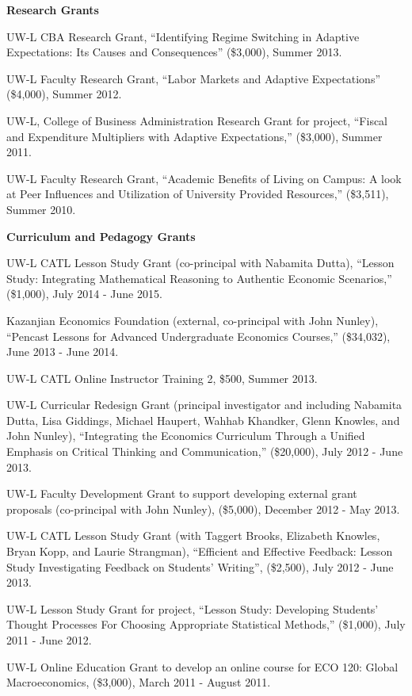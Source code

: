 \documentclass[11pt]{article}
\newcommand{\bd}{\begin{description}}
\newcommand{\ed}{\end{description}}
\newcommand{\toprule}{\par\vspace*{2pt}\noindent{\hrule\hfill}\par\vspace*{1pt}}
\begin{document}
\textbf{Research Grants} \toprule
\bd
\item UW-L CBA Research Grant, ``Identifying Regime Switching in Adaptive Expectations: Its Causes and Consequences'' (\$3,000), Summer 2013.
\item UW-L Faculty Research Grant, ``Labor Markets and Adaptive Expectations'' (\$4,000), Summer 2012.
\item UW-L, College of Business Administration Research Grant for project, ``Fiscal and Expenditure Multipliers with Adaptive Expectations,'' (\$3,000), Summer 2011.
\item UW-L Faculty Research Grant, ``Academic Benefits of Living on Campus: A look at Peer Influences and Utilization of University Provided Resources,'' (\$3,511), Summer 2010. 
\ed

\textbf{Curriculum and Pedagogy Grants} \toprule
\bd
\item UW-L CATL Lesson Study Grant (co-principal with Nabamita Dutta), ``Lesson Study: Integrating Mathematical Reasoning to Authentic Economic Scenarios,'' (\$1,000), July 2014 - June 2015.
\item Kazanjian Economics Foundation (external, co-principal with John Nunley), ``Pencast Lessons for Advanced Undergraduate Economics Courses,'' (\$34,032), June 2013 - June 2014.
\item UW-L CATL Online Instructor Training 2, \$500, Summer 2013.
\item UW-L Curricular Redesign Grant (principal investigator and including Nabamita Dutta, Lisa Giddings, Michael Haupert, Wahhab Khandker, Glenn Knowles, and John Nunley), ``Integrating the Economics Curriculum Through a Unified Emphasis on Critical Thinking and Communication,'' (\$20,000), July 2012 - June 2013.
\item UW-L Faculty Development Grant to support developing external grant proposals (co-principal with John Nunley), (\$5,000), December 2012 - May 2013.
\item UW-L CATL Lesson Study Grant (with Taggert Brooks, Elizabeth Knowles, Bryan Kopp, and Laurie Strangman), ``Efficient and Effective Feedback: Lesson Study Investigating Feedback on Students’ Writing'', (\$2,500), July 2012 - June 2013.
\item UW-L Lesson Study Grant for project, ``Lesson Study: Developing Students' Thought Processes For Choosing Appropriate Statistical Methods,'' (\$1,000), July 2011 - June 2012.
\item UW-L Online Education Grant to develop an online course for ECO 120: Global Macroeconomics, (\$3,000), March 2011 - August 2011.
\ed
\end{document}
